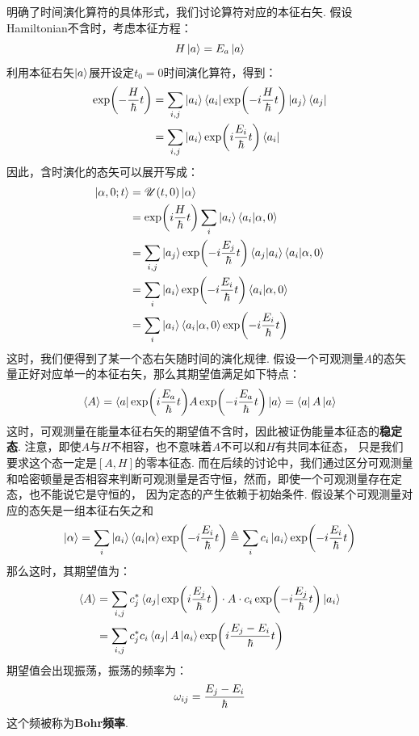 明确了时间演化算符的具体形式，我们讨论算符对应的本征右矢. 假设Hamiltonian不含时，考虑本征方程：
\[
H\ket{a} = E_{a}\ket{a}
\]
利用本征右矢\(\ket{a}\)展开设定\(t_{0}=0\)时间演化算符，得到：
\begin{align*}
\exp(-\frac{H}{\hbar}t) 
& = \sum_{i,j}\ket{a_{i}}\bra{a_{i}}\exp(-i\frac{H}{\hbar}t)\ket{a_{j}}\bra{a_{j}} \\
& = \sum_{i,j}\ket{a_{i}}\exp(i\frac{E_{i}}{\hbar}t)\bra{a_{i}}
\end{align*}
因此，含时演化的态矢可以展开写成：
\begin{align*}
\ket{\alpha,0;t} 
& = \mathscr{U}(t,0)\ket{\alpha} \\
& = \exp(i\frac{H}{\hbar}t)\sum_{i}\ket{a_{i}}\bra{a_{i}}\ket{\alpha,0} \\
& = \sum_{i,j}\ket{a_{j}}\exp(-i\frac{E_{j}}{\hbar}t)\bra{a_{j}}\ket{a_{i}}\bra{a_{i}}\ket{\alpha,0} \\
& = \sum_{i}\ket{a_{i}}\exp(-i\frac{E_{i}}{\hbar}t)\bra{a_{i}}\ket{\alpha,0} \\
& = \sum_{i}\ket{a_{i}}\bra{a_{i}}\ket{\alpha,0}\exp(-i\frac{E_{i}}{\hbar}t)
\end{align*}
这时，我们便得到了某一个态右矢随时间的演化规律. 假设一个可观测量\(A\)的态矢量正好对应单一的本征右矢，那么其期望值满足如下特点：
\[
\left\langle{A}\right\rangle = \bra{a}\exp(i\frac{E_{a}}{\hbar}t)A\exp(-i\frac{E_{a}}{\hbar}t)\ket{a} = \bra{a}A\ket{a}
\]
这时，可观测量在能量本征右矢的期望值不含时，因此被证伪能量本征态的\textbf{稳定态}. 注意，即使\(A\)与\(H\)不相容，也不意味着\(A\)不可以和\(H\)有共同本征态，
只是我们要求这个态一定是\([A,H]\)的零本征态. 而在后续的讨论中，我们通过区分可观测量和哈密顿量是否相容来判断可观测量是否守恒，然而，即使一个可观测量存在定态，也不能说它是守恒的，
因为定态的产生依赖于初始条件. 假设某个可观测量对应的态矢是一组本征右矢之和
\[
\ket{\alpha} = \sum_{i}\ket{a_{i}}\bra{a_{i}}\ket{\alpha}\exp(-i\frac{E_{i}}{\hbar}t) \triangleq \sum_{i}c_{i}\ket{a_{i}}\exp(-i\frac{E_{i}}{\hbar}t)
\]
那么这时，其期望值为：
\begin{align*}
\left\langle{A}\right\rangle
& = \sum_{i,j}c_{j}^{*}\bra{a_{j}}\exp(i\frac{E_{j}}{\hbar}t)\cdot{A}\cdot c_{i}\exp(-i\frac{E_{j}}{\hbar}t)\ket{a_{i}} \\
& = \sum_{i,j}c_{j}^{*}c_{i}\bra{a_{j}}A\ket{a_{i}}\exp(i\frac{E_{j} - E_{i}}{\hbar}t)
\end{align*}
期望值会出现振荡，振荡的频率为：
\[
\omega_{ij} = \frac{E_{j} - E_{i}}{\hbar}
\]
这个频被称为\textbf{Bohr频率}. 
